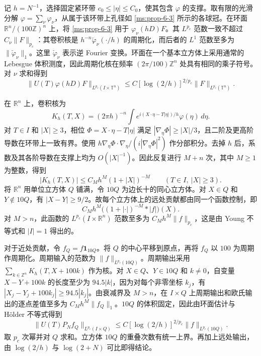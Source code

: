 记 \(h=N^{-1}\)，选择固定紧环带 \(c_0\le|\eta|\le C_0\)，使其包含 \(\varphi\) 的支撑。取有限的光滑分解 \(\varphi=\sum_\nu\varphi_\nu\)，从属于该环带上孔径如 \ref{ms:prop-6-3} 所示的各球冠。在环面 \(\mathbb R^n/(100\mathbb Z)^n\) 上，将 \ref{ms:prop-6-3} 用于 \(\varphi_\nu(hD)F\)。其 \(L^{p_c}\) 范数一致不超过 \(C_\nu\|F\|_{p_c}\)：其卷积核是 \(h^{-n}\check\varphi_\nu(\cdot/h)\) 的周期化，而后者的 \(L^1\) 范数至多为 \(\|\check\varphi_\nu\|_1\)。这里 \(\check\varphi_\nu\) 表示逆 Fourier 变换。环面在一个基本立方体上采用通常的 Lebesgue 体积测度，因此周期化核在频率 \((2\pi/100)\mathbb Z^n\) 处具有相同的乘子符号。对 \(\nu\) 求和得到
\[
 \|U(T)\varphi(hD)F\|_{L^{p_c}(I\times\mathbb T^n)}
 \le C[\log(2/h)]^{2/p_c}\|F\|_{L^{p_c}(\mathbb T^n)}.
\]

在 \(\mathbb R^n\) 上，卷积核为
\[
 K_h(T,X)=(2\pi h)^{-n}
   \int e^{i(X\cdot\eta-T|\eta|)/h}\varphi(\eta)\,d\eta .
\]
对 \(T\in I\) 和 \(|X|\ge3\)，相位 \(\Phi=X\cdot\eta-T|\eta|\) 满足 \(|\nabla_\eta\Phi|\ge |X|/3\)，且二阶及更高阶导数在环带上一致有界。使用 \(h\nabla_\eta\Phi\cdot\nabla_\eta/(i|\nabla_\eta\Phi|^2)\) 作分部积分。去掉 \(h\) 后，系数及其各阶导数在支撑上均为 \(O(|X|^{-1})\)。因此反复进行 \(M+n\) 次，其中 \(M\ge1\) 为整数，得到
\[
 |K_h(T,X)|\le C_M h^M(1+|X|)^{-M}
 \qquad (T\in I,\ |X|\ge3).
\]
将 \(\mathbb R^n\) 用单位立方体 \(Q\) 铺满，令 \(10Q\) 为边长十的同心立方体。对 \(X\in Q\) 和 \(Y\notin 10Q\)，有 \(|X-Y|\ge9/2\)。故每个立方体上的远处贡献都由同一个函数控制，即
\[
 C_M h^M\big((1+|\cdot|)^{-M}*|f|\big)(X).
\]
对 \(M>n\)，此函数的 \(L^{p_c}(I\times\mathbb R^n)\) 范数至多为 \(C_M h^M\|f\|_{p_c}\)，这是由 Young 不等式和 \(|I|=1\) 得出的。

对于近处贡献，令 \(f_Q=f\mathbf 1_{10Q}\)。将 \(Q\) 的中心平移到原点，再将 \(f_Q\) 以 \(100\) 为周期作周期化。周期输入的范数为 \(\|f\|_{L^{p_c}(10Q)}\)。周期输出采用 \(\sum_{k\in\mathbb Z^n}K_h(T,X+100k)\) 作为核。对 \(X\in Q\)、\(Y\in 10Q\) 和 \(k\ne0\)，自变量 \(X-Y+100k\) 的长度至少为 \(94.5|k|\)，因为对每个非零坐标 \(k_j\)，有 \(|X_j-Y_j+100k_j|\ge 94.5 |k_j|\)。由衰减界及 \(M>n\)，在 \(I\times Q\) 上周期输出和欧氏输出的逐点差值至多为 \(C_M h^M\|f_Q\|_1\)。\(10Q\) 的体积固定，因此由环面估计与 Hölder 不等式得到
\[
 \|U(T)P_Nf_Q\|_{L^{p_c}(I\times Q)}
 \le C[\log(2/h)]^{2/p_c}\|f\|_{L^{p_c}(10Q)}.
\]
取 \(p_c\) 次幂并对 \(Q\) 求和。立方体 \(10Q\) 的重叠次数有统一上界。再加上远处输出，由 \(\log(2/h)\) 与 \(\log(2+N)\) 可比即得结论。

